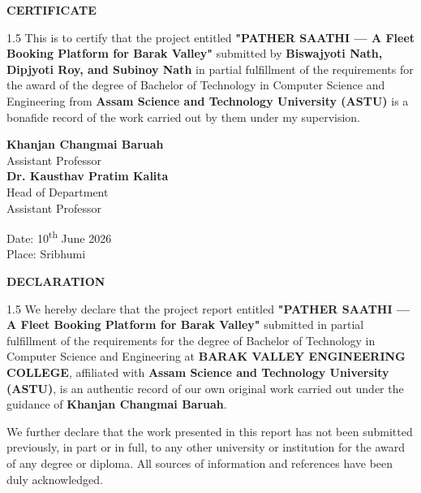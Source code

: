 \documentclass[12pt, a4paper, oneside]{report}
\begin{document}
\newpage
\thispagestyle{empty}
\begin{center}
    {\Huge \textbf{CERTIFICATE}}\par
    \vspace{1.5cm}
\end{center}

\begin{spacing}{1.5}
This is to certify that the project entitled \textbf{"PATHER SAATHI --- A Fleet Booking Platform for Barak Valley"} submitted by \textbf{Biswajyoti Nath, Dipjyoti Roy, and Subinoy Nath} in partial fulfillment of the requirements for the award of the degree of Bachelor of Technology in Computer Science and Engineering from \textbf{Assam Science and Technology University (ASTU)} is a bonafide record of the work carried out by them under my supervision.
\end{spacing}

\vspace{3cm}

\begin{flushright}
    \textbf{Khanjan Changmai Baruah}\\
    \relax Assistant Professor\\
    \vspace{1.5cm}
    \textbf{Dr. Kausthav Pratim Kalita}\\
    Head of Department\\
    \relax Assistant Professor
\end{flushright}

\vspace{1.5cm}
\noindent Date: 10\textsuperscript{th} June 2026\\
Place: Sribhumi

\newpage
\thispagestyle{empty}
\begin{center}
    {\Huge \textbf{DECLARATION}}\par
    \vspace{1.5cm}
\end{center}

\begin{spacing}{1.5}
We hereby declare that the project report entitled \textbf{"PATHER SAATHI --- A Fleet Booking Platform for Barak Valley"} submitted in partial fulfillment of the requirements for the degree of Bachelor of Technology in Computer Science and Engineering at \textbf{BARAK VALLEY ENGINEERING COLLEGE}, affiliated with \textbf{Assam Science and Technology University (ASTU)}, is an authentic record of our own original work carried out under the guidance of \textbf{Khanjan Changmai Baruah}.

We further declare that the work presented in this report has not been submitted previously, in part or in full, to any other university or institution for the award of any degree or diploma. All sources of information and references have been duly acknowledged.
\end{spacing}
\end{document}
